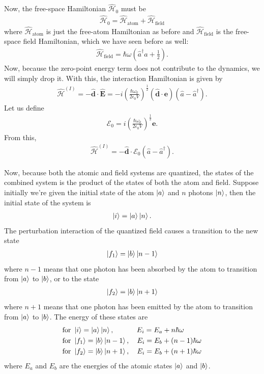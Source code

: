 \documentclass{book}
\theoremstyle{definition}
\newcommand{\ham}{\mathcal{H}}
\newcommand{\f}[2]{\frac{#1}{#2}}
\newcommand{\lp}{\left(}
\newcommand{\rp}{\right)}
\begin{document}
Now, the free-space Hamiltonian $\hat{\ham}_0$ must be
\begin{align}
\hat{\ham}_0 = \hat{\ham}_\text{atom} + \hat{\ham}_\text{field}
\end{align}
where $\hat{\ham}_\text{atom}$ is just the free-atom Hamiltonian as before and $\hat{\ham}_\text{field}$ is the free-space field Hamiltonian, which we have seen before as well:
\begin{align}
\hat{\ham}_\text{field} = \hbar\omega\lp \hat{a}^\dagger\hat{a} + \f{1}{2} \rp.
\end{align}
Now, because the zero-point energy term does not contribute to the dynamics, we will simply drop it. With this, the interaction Hamiltonian is given by
\begin{align}
\hat{\ham}^{(I)} = -\hat{\mathbf{d}} \cdot\hat{\mathbf{E}} = - i \lp \f{\hbar\omega_k}{2\epsilon_0 V} \rp^{\f{1}{2}}\lp \hat{\mathbf{d}}\cdot\mathbf{e} \rp \lp \hat{a} - \hat{a}^\dagger\rp.
\end{align}
Let us define
\begin{align}
\bm{\mathcal{E}}_0 = i \lp \f{\hbar\omega_k}{2\epsilon_0 V} \rp^{\f{1}{2}}\mathbf{e}.
\end{align}
From this,
\begin{align}
\hat{\ham}^{(I)} = - \hat{\mathbf{d}}\cdot\bm{\mathcal{E}}_0\lp \hat{a} - \hat{a}^\dagger\rp.
\end{align}

Now, because both the atomic and field systems are quantized, the states of the combined system is the product of the states of both the atom and field. Suppose initially we're given the initial state of the atom $\ket{a}$ and $n$ photons $\ket{n}$, then the initial state of the system is
\begin{align}
\ket{i} = \ket{a}\ket{n}. 
\end{align} 
The perturbation interaction of the quantized field causes a transition to the new state 
\begin{align}
\ket{f_1} = \ket{b}\ket{n-1}
\end{align}
where $n-1$ means that one photon has been absorbed by the atom to transition from $\ket{a}$ to $\ket{b}$, or to the state
\begin{align}
\ket{f_2} = \ket{b}\ket{n+1}
\end{align}
where $n+1$ means that one photon has been emitted by the atom to transition from $\ket{a}$ to $\ket{b}$. The energy of these states are
\begin{align}
&\text{for } \ket{i} = \ket{a}\ket{n}, \quad\quad\quad\, E_i = E_a + n\hbar\omega \\
&\text{for } \ket{f_1} = \ket{b}\ket{n-1}, \quad E_i = E_b + (n-1)\hbar\omega \\
&\text{for } \ket{f_2} = \ket{b}\ket{n+1}, \quad E_i = E_b + (n+1)\hbar\omega
\end{align}
where $E_a$ and $E_b$ are the energies of the atomic states $\ket{a}$ and $\ket{b}$. \\
\end{document}
